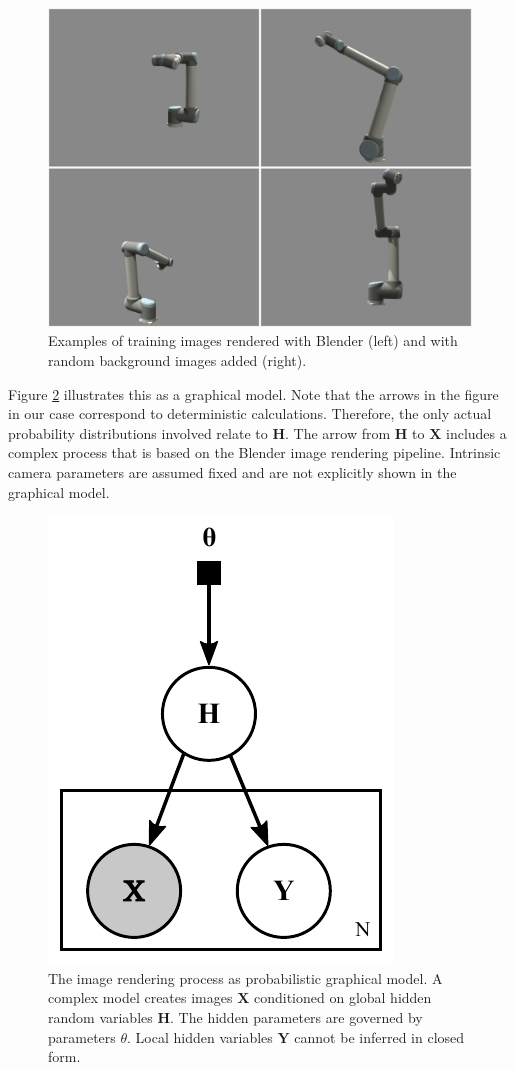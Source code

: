 \documentclass[conference]{IEEEtran}
\begin{document}
    \begin{figure}[htbp]
        \centerline{\includegraphics[width=0.9\columnwidth]{figures/examplesUR10/renderedImages.png}}
        \caption{\label{fig:ur10examples} Examples of training images rendered with Blender (left) and with random background images added (right).}
    \end{figure}
    
    Figure \ref{fig:probModel} illustrates this as a graphical model. Note that the arrows in the figure in our case correspond to deterministic calculations. Therefore, the only actual probability distributions involved relate to $\mathbf{H}$. The arrow from $\mathbf{H}$ to $\mathbf{X}$ includes a complex process that is based on the Blender image rendering pipeline. Intrinsic camera parameters are assumed fixed and are not explicitly shown in the graphical model.

    \begin{figure}[htbp]
        \centerline{\includegraphics[width=0.33\columnwidth]{figures/probModel/probModel.pdf}}
        \caption{\label{fig:probModel} The image rendering process as probabilistic graphical model. A complex model creates images $\mathbf{X}$ conditioned on global hidden random variables $\mathbf{H}$. The hidden parameters are governed by parameters $\theta$. Local hidden variables $\mathbf{Y}$ cannot be inferred in closed form.}
    \end{figure}
\end{document}
